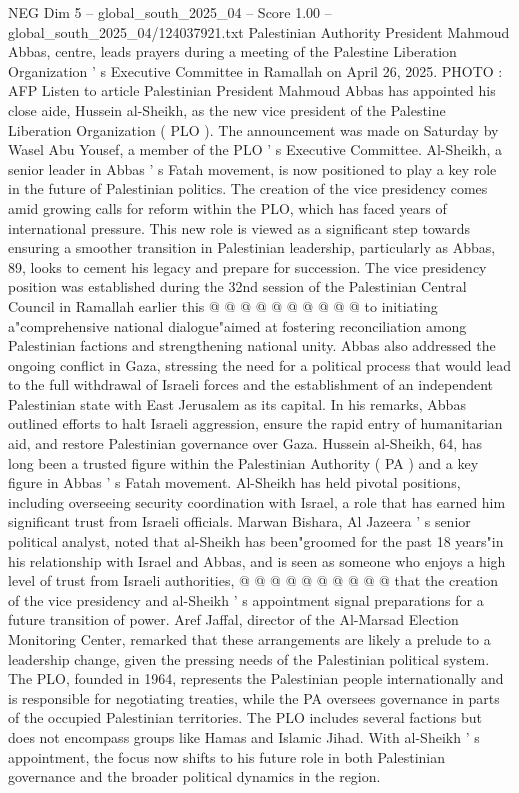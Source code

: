 \begin{textsample}{NEG Dim 5 – global\_south\_2025\_04 – Score 1.00 – global\_south\_2025\_04/124037921.txt}  \label{ex:f5_neg_399}
Palestinian Authority President Mahmoud Abbas, centre, leads prayers during a meeting of the Palestine Liberation Organization ' s Executive Committee in Ramallah on April 26, 2025.
PHOTO : AFP Listen to article Palestinian President Mahmoud Abbas has appointed his close aide, Hussein al-Sheikh, as the new vice president of the Palestine Liberation Organization ( PLO ).
The announcement was made on Saturday by Wasel Abu Yousef, a member of the PLO ' s Executive Committee.
Al-Sheikh, a senior leader in Abbas ' s Fatah movement, is now positioned to play a key role in the future of Palestinian politics.
The creation of the vice presidency comes amid growing calls for reform within the PLO, which has faced years of international pressure.
This new role is viewed as a significant step towards ensuring a smoother transition in Palestinian leadership, particularly as Abbas, 89, looks to cement his legacy and prepare for succession.
The vice presidency position was established during the 32nd session of the Palestinian Central Council in Ramallah earlier this @ @ @ @ @ @ @ @ @ @ to initiating a"comprehensive national dialogue"aimed at fostering reconciliation among Palestinian factions and strengthening national unity.
Abbas also addressed the ongoing conflict in Gaza, stressing the need for a political process that would lead to the full withdrawal of Israeli forces and the establishment of an independent Palestinian state with East Jerusalem as its capital.
In his remarks, Abbas outlined efforts to halt Israeli aggression, ensure the rapid entry of humanitarian aid, and restore Palestinian governance over Gaza.
Hussein al-Sheikh, 64, has long been a trusted figure within the Palestinian Authority ( PA ) and a key figure in Abbas ' s Fatah movement.
Al-Sheikh has held pivotal positions, including overseeing security coordination with Israel, a role that has earned him significant trust from Israeli officials.
Marwan Bishara, Al Jazeera ' s senior political analyst, noted that al-Sheikh has been"groomed for the past 18 years"in his relationship with Israel and Abbas, and is seen as someone who enjoys a high level of trust from Israeli authorities, @ @ @ @ @ @ @ @ @ @ that the creation of the vice presidency and al-Sheikh ' s appointment signal preparations for a future transition of power.
Aref Jaffal, director of the Al-Marsad Election Monitoring Center, remarked that these arrangements are likely a prelude to a leadership change, given the pressing needs of the Palestinian political system.
The PLO, founded in 1964, represents the Palestinian people internationally and is responsible for negotiating treaties, while the PA oversees governance in parts of the occupied Palestinian territories.
The PLO includes several factions but does not encompass groups like Hamas and Islamic Jihad.
With al-Sheikh ' s appointment, the focus now shifts to his future role in both Palestinian governance and the broader political dynamics in the region.

\end{textsample}
